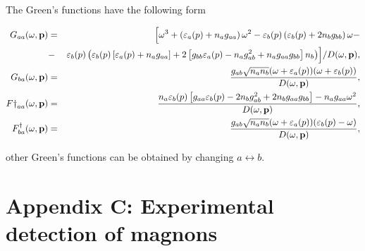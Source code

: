 \documentclass[reprint,superscriptaddress,showpacs,nofootinbib,aps,pra]{revtex4-1}
\begin{document}
The Green's functions have the following form
\begin{widetext}
\begin{eqnarray}
  G_{aa}(\omega, \textbf{p}) &=& \Bigl[ \omega^3 + \left(\varepsilon_a(p) + n_a g_{aa} \right) \omega^2 -  \varepsilon_b(p) \left(\varepsilon_b(p) + 2 n_b g_{bb}\right) \omega - \\ \nonumber &-& \varepsilon_b(p) \left(\varepsilon_b(p)\left[\varepsilon_a(p) + n_a g_{aa}\right] + 2 \left[g_{bb}\varepsilon_a(p) - n_a g^2_{ab} + n_a g_{aa} g_{bb}\right]n_b \right) \Bigr]/D(\omega, \textbf{p}), \\
  G_{ba}(\omega, \textbf{p}) &=& \frac{g_{ab}\sqrt{n_a n_b}(\omega+\varepsilon_a(p))(\omega+\varepsilon_b(p))}{D(\omega, \textbf{p})}, \\
  F\dag_{aa}(\omega, \textbf{p}) &=& \frac{n_a \varepsilon_b(p) \left[ g_{aa}\varepsilon_b(p) - 2 n_b g^2_{ab} + 2 n_b g_{aa} g_{bb} \right] - n_a g_{aa} \omega^2 }{D(\omega, \textbf{p})}, \\
  F^\dag_{ba}(\omega, \textbf{p}) &=& \frac{g_{ab}\sqrt{n_a n_b}(\omega+\varepsilon_a(p))(\varepsilon_b(p)-\omega)}{D(\omega, \textbf{p})},
\end{eqnarray}
\end{widetext}
other Green's functions can be obtained by changing $a \leftrightarrow b$.

\section*{Appendix C: Experimental detection of magnons}
\end{document}
